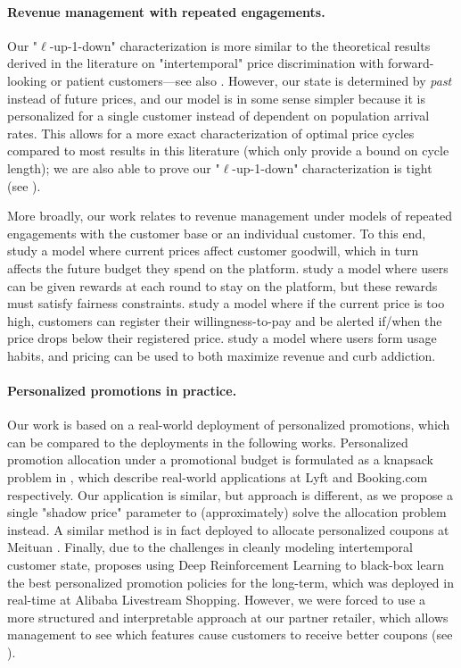 \documentclass[format=acmsmall, review=false]{acmart}
\begin{document}
\paragraph{Revenue management with repeated engagements.}
Our "$\ell$-up-1-down" characterization is more similar to the theoretical results derived in the literature on "intertemporal" price discrimination with forward-looking \citep{besbes2015intertemporal} or patient \citep{liu2015optimal} customers---see also \citet{wang2016intertemporal,lobel2020dynamic}.
However, our state is determined by \textit{past} instead of future prices, and our model is in some sense simpler because it is personalized for a single customer instead of dependent on population arrival rates.
This allows for a more exact characterization of optimal price cycles compared to most results in this literature (which only provide a bound on cycle length); we are also able to prove our "$\ell$-up-1-down" characterization is tight (see ).

More broadly, our work relates to revenue management under models of repeated engagements with the customer base or an individual customer.
To this end,
\citet{calmon2021revenue} study a model where current prices affect customer goodwill, which in turn affects the future budget they spend on the platform.
\citet{freund2021fair} study a model where users can be given rewards at each round to stay on the platform, but these rewards must satisfy fairness constraints.
\citet{jiang2022revenue} study a model where if the current price is too high, customers can register their willingness-to-pay and be alerted if/when the price drops below their registered price.
\citet{chang2024pricing} study a model where users form usage habits, and pricing can be used to both maximize revenue and curb addiction.

\paragraph{Personalized promotions in practice.}
Our work is based on a real-world deployment of personalized promotions, which can be compared to the deployments in the following works.
Personalized promotion allocation under a promotional budget is formulated as a knapsack problem in \citet{shmoys2019how,albert2022commerce}, which describe real-world applications at Lyft and Booking.com respectively.
Our application is similar, but approach is different, as we propose a single "shadow price" parameter to (approximately) solve the allocation problem instead.  A similar method is in fact deployed to allocate personalized coupons at Meituan \citep{dai2024data}.
Finally, due to the challenges in cleanly modeling intertemporal customer state, \citet{liu2023dynamic} proposes using Deep Reinforcement Learning to black-box learn the best personalized promotion policies for the long-term, which was deployed in real-time at Alibaba Livestream Shopping.
However, we were forced to use a more structured and interpretable approach at our partner retailer, which allows management to see which features cause customers to receive better coupons (see ).
\end{document}
